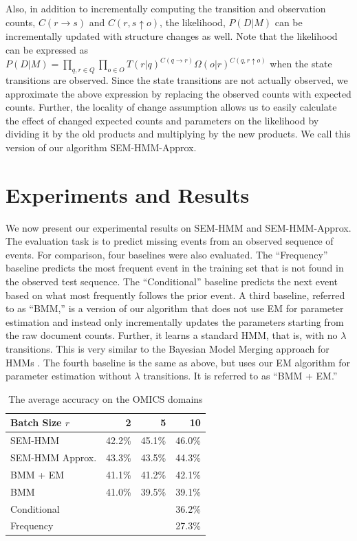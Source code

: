 \documentclass[letterpaper]{article}
\begin{document}
Also, in addition to incrementally computing the transition and observation counts, $C(r \rightarrow s)$ and $C(r,s \uparrow o)$, the likelihood, $P(D|M)$ can be incrementally updated with structure changes as well. Note that the likelihood can be expressed as $P(D|M) = \prod_{q, r \in Q} \prod_{o \in O} T(r|q)^{C(q \rightarrow r)} \Omega(o|r)^{C(q,r \uparrow o)}$ when the state transitions are observed. Since the state transitions are not actually observed, we approximate the above expression by replacing the observed counts with expected counts. Further, the locality of change assumption allows us to easily
calculate the effect of changed expected counts and parameters on the likelihood by dividing it by the old products and multiplying by the new products. We call this version of our algorithm SEM-HMM-Approx.

\section{Experiments and Results}

We now present our experimental results on SEM-HMM and SEM-HMM-Approx. The
evaluation task is to predict missing events from an observed sequence of events.
For comparison, four baselines were also evaluated.  The ``Frequency'' baseline predicts the most frequent event in the training set that is not found in the observed test sequence. The ``Conditional'' baseline predicts the next event based on what most frequently follows the prior event.  %
A third baseline, referred to as ``BMM,'' is a version of our algorithm that does not use EM for parameter estimation and instead only incrementally updates the parameters starting from the raw document counts. Further, it learns a standard HMM, that is, with no $\lambda$ transitions.
This is very similar to the Bayesian Model Merging approach for HMMs \cite{stolcke1994best}.
The fourth baseline is the same as above, but uses our EM algorithm for parameter estimation without $\lambda$ transitions. It is referred to as ``BMM + EM.''

\begin{table}
\footnotesize
\begin{center}
\begin{tabular}{|l|r|r|r|}
\hline
Batch Size $r$ & 2 & 5 & 10\\
\hline
SEM-HMM & 42.2\% & 45.1\% & 46.0\%\\
SEM-HMM Approx.& 43.3\% & 43.5\% & 44.3\%\\
BMM + EM & 41.1\% & 41.2\% & 42.1\%\\
BMM & 41.0\% & 39.5\% & 39.1\%\\
\hline
Conditional & \multicolumn{3}{r|}{36.2\%}\\
Frequency & \multicolumn{3}{r|}{27.3\%}\\
\hline
\end{tabular}
\caption{The average accuracy on the OMICS domains}
\end{center}
\label{table:omics}
\end{table}
\end{document}
